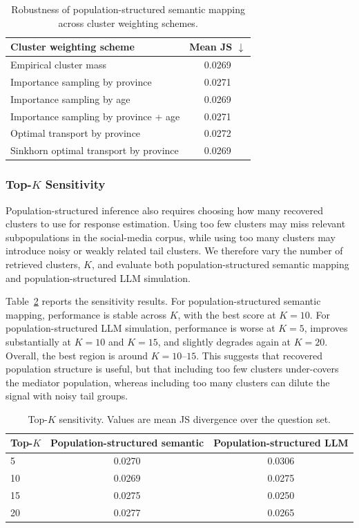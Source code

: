 \documentclass{article}
\begin{document}
\begin{table}[htb!]
\centering
\small
\begin{tabular}{lc}
\toprule
Cluster weighting scheme & Mean JS $\downarrow$ \\
\midrule
Empirical cluster mass & 0.0269 \\
Importance sampling by province & 0.0271 \\
Importance sampling by age & 0.0269 \\
Importance sampling by province + age & 0.0271 \\
Optimal transport by province & 0.0272 \\
Sinkhorn optimal transport by province & 0.0269 \\
\bottomrule
\end{tabular}
\caption{Robustness of population-structured semantic mapping across cluster weighting schemes.}
\label{tab:reweighting}
\end{table}

\subsubsection{Top-$K$ Sensitivity}
\label{sensitivity}

Population-structured inference also requires choosing how many recovered clusters to use for response estimation.
Using too few clusters may miss relevant subpopulations in the social-media corpus,
while using too many clusters may introduce noisy or weakly related tail clusters.
We therefore vary the number of retrieved clusters, $K$, and evaluate both population-structured semantic mapping and population-structured LLM simulation.

Table~\ref{tab:topk} reports the sensitivity results.
For population-structured semantic mapping, performance is stable across $K$,
with the best score at $K=10$.
For population-structured LLM simulation, performance is worse at $K=5$,
improves substantially at $K=10$ and $K=15$,
and slightly degrades again at $K=20$.
Overall, the best region is around $K=10$--$15$.
This suggests that recovered population structure is useful,
but that including too few clusters under-covers the mediator population,
whereas including too many clusters can dilute the signal with noisy tail groups.

\begin{table}[htb!]
\centering
\small
\begin{tabular}{lcc}
\toprule
Top-$K$ & Population-structured semantic & Population-structured LLM \\
\midrule
5  & 0.0270 & 0.0306 \\
10 & 0.0269 & 0.0275 \\
15 & 0.0275 & 0.0250 \\
20 & 0.0277 & 0.0265 \\
\bottomrule
\end{tabular}
\caption{Top-$K$ sensitivity. Values are mean JS divergence over the question set.}
\label{tab:topk}
\end{table}
\end{document}
